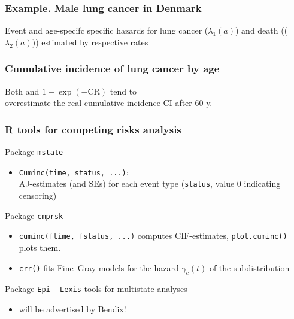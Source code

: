\documentclass[handout,12pt,dvipsnames,t]{beamer}
\begin{document}
\begin{frame}
\frametitle{Example. Male lung cancer in Denmark}

Event and age-specifc specific hazards for lung cancer ($\lambda_1(a)$) and death (($\lambda_2(a)$)) estimated by respective rates

\end{frame}
  

\begin{frame}
\frametitle{Cumulative incidence of lung cancer by age}


Both  and $1 - \exp(- \text{CR})$ tend to \\
 overestimate the real cumulative incidence CI after 60 y.
\end{frame}

\begin{frame}

\frametitle{R tools for competing risks analysis}

Package \texttt{mstate}
\begin{itemize}
\item \texttt{Cuminc(time, status, ...)}:  \\
 AJ-estimates (and SEs) for each event type 
  (\texttt{status}, value 0 indicating censoring)
\end{itemize}
Package \texttt{cmprsk}
\begin{itemize}
\item \texttt{cuminc(ftime, fstatus, ...)} 
  computes CIF-estimates,  %
   \texttt{plot.cuminc()} plots them. 
  \medskip
\item \texttt{crr()}
 fits Fine--Gray models for 
the hazard $\gamma_c(t)$ of the subdistribution
\end{itemize}   
Package \texttt{Epi} -- \texttt{Lexis} tools for multistate analyses
\begin{itemize}
\item  will be advertised by Bendix!
\end{itemize}

\end{frame}
\end{document}

